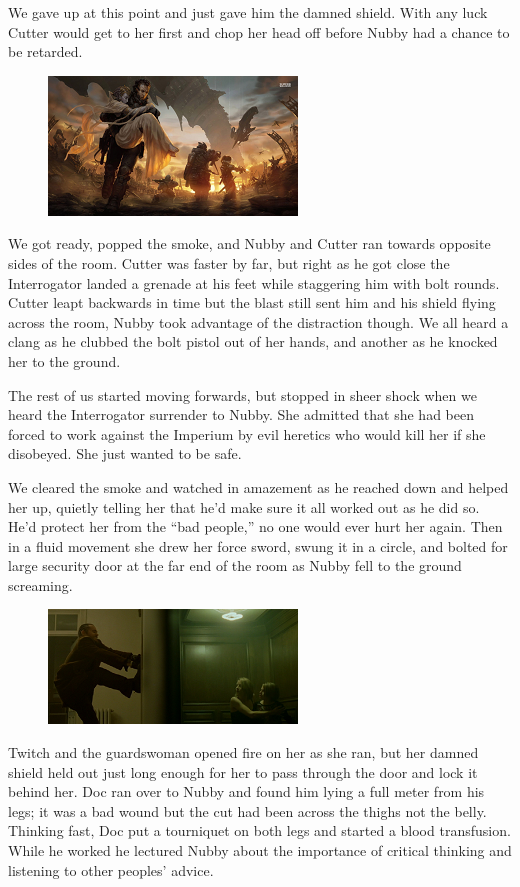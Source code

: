 We gave up at this point and just gave him the damned shield. With any luck Cutter would get to her first and chop her head off before Nubby had a chance to be retarded.

\begin{figure}
	\begin{center}
		\includegraphics[width=\figwidth]{pics/5/36.png}
	\end{center}
\end{figure}
We got ready, popped the smoke, and Nubby and Cutter ran towards opposite sides of the room. 
Cutter was faster by far, but right as he got close the Interrogator landed a grenade at his feet while staggering him with bolt rounds. 
Cutter leapt backwards in time but the blast still sent him and his shield flying across the room, Nubby took advantage of the distraction though. 
We all heard a clang as he clubbed the bolt pistol out of her hands, and another as he knocked her to the ground.

The rest of us started moving forwards, but stopped in sheer shock when we heard the Interrogator surrender to Nubby. 
She admitted that she had been forced to work against the Imperium by evil heretics who would kill her if she disobeyed. 
She just wanted to be safe.

We cleared the smoke and watched in amazement as he reached down and helped her up, quietly telling her that he’d make sure it all worked out as he did so. 
He’d protect her from the “bad people,” no one would ever hurt her again. 
Then in a fluid movement she drew her force sword, swung it in a circle, and bolted for large security door at the far end of the room as Nubby fell to the ground screaming.

\begin{figure}
	\begin{center}
		\includegraphics[width=\figwidth]{pics/5/37.png}
	\end{center}
\end{figure}
Twitch and the guardswoman opened fire on her as she ran, but her damned shield held out just long enough for her to pass through the door and lock it behind her. 
Doc ran over to Nubby and found him lying a full meter from his legs; 
it was a bad wound but the cut had been across the thighs not the belly. 
Thinking fast, Doc put a tourniquet on both legs and started a blood transfusion. 
While he worked he lectured Nubby about the importance of critical thinking and listening to other peoples’ advice.

